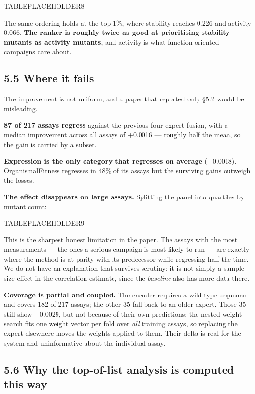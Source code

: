 TABLEPLACEHOLDER8

The same ordering holds at the top 1\%, where stability reaches 0.226 and activity 0.066. \textbf{The ranker is
roughly twice as good at prioritising stability mutants as activity mutants}, and activity is what
function-oriented campaigns care about.

\hypertarget{where-it-fails}{%
\subsection{5.5 Where it fails}\label{where-it-fails}}

The improvement is not uniform, and a paper that reported only §5.2 would be misleading.

\textbf{87 of 217 assays regress} against the previous four-expert fusion, with a median improvement across
all assays of +0.0016 --- roughly half the mean, so the gain is carried by a subset.

\textbf{Expression is the only category that regresses on average} (−0.0018). OrganismalFitness regresses in
48\% of its assays but the surviving gains outweigh the losses.

\textbf{The effect disappears on large assays.} Splitting the panel into quartiles by mutant count:

TABLEPLACEHOLDER9

This is the sharpest honest limitation in the paper. The assays with the most measurements --- the ones a
serious campaign is most likely to run --- are exactly where the method is at parity with its predecessor
while regressing half the time. We do not have an explanation that survives scrutiny: it is not simply a
sample-size effect in the correlation estimate, since the \emph{baseline} also has more data there.

\textbf{Coverage is partial and coupled.} The encoder requires a wild-type sequence and covers 182 of 217
assays; the other 35 fall back to an older expert. Those 35 still show +0.0029, but not because of their
own predictions: the nested weight search fits one weight vector per fold over \emph{all} training assays, so
replacing the expert elsewhere moves the weights applied to them. Their delta is real for the system and
uninformative about the individual assay.

\hypertarget{why-the-top-of-list-analysis-is-computed-this-way}{%
\subsection{5.6 Why the top-of-list analysis is computed this way}\label{why-the-top-of-list-analysis-is-computed-this-way}}

